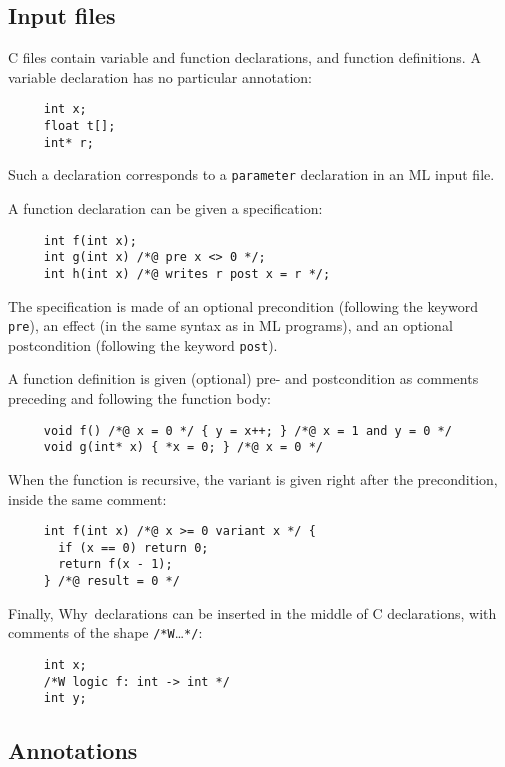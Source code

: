 \documentclass[a4paper,12pt]{report}
\newcommand{\why}{\textsf{Why}}
\begin{document}
\subsection{Input files}

C files contain variable and function declarations, and function
definitions. 
A variable declaration has no particular annotation:
\begin{verbatim}
     int x;
     float t[];
     int* r;
\end{verbatim}
Such a declaration corresponds to a \texttt{parameter} declaration in
an ML input file.

A function declaration can be given a specification:
\begin{verbatim}
     int f(int x);
     int g(int x) /*@ pre x <> 0 */;
     int h(int x) /*@ writes r post x = r */;
\end{verbatim}
The specification is made of an optional precondition (following
the keyword \texttt{pre}), an effect (in the same syntax as in ML
programs), and an optional postcondition (following the keyword
\texttt{post}). 

A function definition is given (optional) pre- and postcondition as
comments preceding and following the function body:
\begin{verbatim}
     void f() /*@ x = 0 */ { y = x++; } /*@ x = 1 and y = 0 */
     void g(int* x) { *x = 0; } /*@ x = 0 */
\end{verbatim}
When the function is recursive, the variant is given right after the
precondition, inside the same comment:
\begin{verbatim}
     int f(int x) /*@ x >= 0 variant x */ {
       if (x == 0) return 0;
       return f(x - 1);
     } /*@ result = 0 */
\end{verbatim}

Finally, \why\ declarations can be inserted in the middle of C
declarations, with comments of the shape \texttt{/*W}\dots\texttt{*/}:
\begin{verbatim}
     int x;
     /*W logic f: int -> int */
     int y;
\end{verbatim}

\subsection{Annotations}
\end{document}
